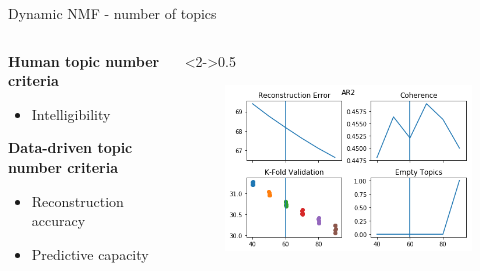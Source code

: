 \documentclass[9pt]{beamer}
\begin{document}
\begin{frame}[t]{Dynamic NMF - number of topics}

\begin{columns}
\begin{column}{0.5\linewidth}
	\textbf{Human topic number criteria}
	\begin{itemize}
		\item Intelligibility
	\end{itemize}
	\textbf{Data-driven topic number criteria}
	\begin{itemize}
		\item Reconstruction accuracy
		\item Predictive capacity
	\end{itemize}
\end{column}
\begin{column}<2->{0.5\linewidth}
	
	\begin{figure}
		\includegraphics[width=0.8\linewidth]{../plots/topic_validations_AR2}
		

\end{figure}
\end{column}
\end{columns}
\end{frame}
\end{document}
